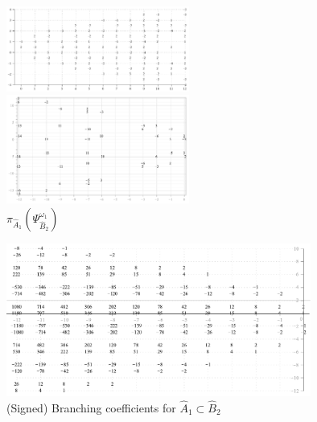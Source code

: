 \documentclass[pdftex]{beamer}
\theoremstyle{definition} \newtheorem{Def}{Definition}
\begin{document}
\begin{frame}
  \begin{figure}[t]
    \vspace*{-0.5cm}
    \begin{multicols}{2}
      \hfill
      \includegraphics[width=60mm]{figures/figure10}
      \hfill
      \caption{$\Gamma_{\hat A_1\subset \hat B_2}$}
      \hfill
      \includegraphics[width=60mm]{figures/figure12}
      \caption{ $\pi_{\hat A_{1}}\left( \Psi ^{\omega_1  }_{\hat B_{2}}\right)$}
    \end{multicols}
  \end{figure}
  \begin{figure}[b]
    \vspace*{-1.3cm}
    \centering
      \includegraphics[width=100mm]{figures/figure13}
    \caption{(Signed) Branching coefficients for $\hat A_1\subset \hat B_2$}
    \label{fig:2}
  \end{figure}
\end{frame}
\end{document}
